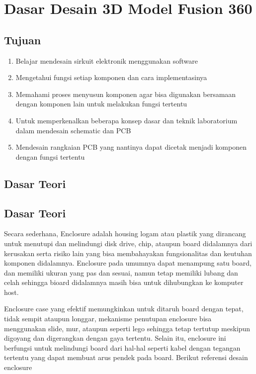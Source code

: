 \chapter{Dasar Desain 3D Model Fusion 360}

\section{Tujuan}
\begin{enumerate}
    \item Belajar mendesain sirkuit elektronik menggunakan software
    \item Mengetahui fungsi setiap komponen dan cara implementasinya
    \item Memahami proses menyusun komponen agar bisa digunakan bersamaan dengan komponen lain
    untuk melakukan fungsi tertentu
    \item Untuk memperkenalkan beberapa konsep dasar dan teknik laboratorium dalam mendesain
    schematic dan PCB
    \item Mendesain rangkaian PCB yang nantinya dapat dicetak menjadi komponen dengan fungsi
    tertentu
\end{enumerate}

\section{Dasar Teori}
\section{Dasar Teori}
Secara sederhana, Enclosure adalah housing logam atau plastik yang dirancang untuk menutupi dan
melindungi disk drive, chip, ataupun board didalamnya dari kerusakan serta risiko lain yang bisa
membahayakan fungsionalitas dan keutuhan komponen didalamnya. Enclosure pada umumnya dapat
menampung satu board, dan memiliki ukuran yang pas dan sesuai, namun tetap memiliki lubang dan celah
sehingga bioard didalamnya masih bisa untuk dihubungkan ke komputer host.

Enclosure case yang efektif memungkinkan untuk ditaruh board dengan tepat, tidak sempit ataupun
longgar, mekanisme penutupan enclosure bisa menggunakan slide, mur, ataupun seperti lego sehingga
tetap tertutup meskipun digoyang dan digerangkan dengan gaya tertentu. Selain itu, enclosure ini
berfungsi untuk melindungi board dari hal-hal seperti kabel dengan tegangan tertentu yang dapat
membuat arus pendek pada board. Berikut referensi desain enclosure

